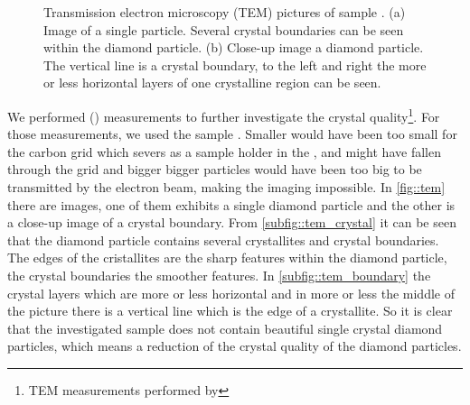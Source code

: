 \begin{figure}[tp]
\begin{subfigure}[t]{ 0.49\linewidth}
				\label{subfig::tem_boundary}
			\end{subfigure}
			\caption{Transmission electron microscopy (TEM) pictures of sample \insituH. (a) Image of a single \nd particle. Several crystal boundaries can be seen within the diamond particle. (b) Close-up image a diamond particle. The vertical line is a crystal boundary, to the left and right the more or less horizontal layers of one crystalline region can be seen.}
			\label{fig::tem}
		\end{figure}


		We performed \tem (\TEM) measurements to further investigate the crystal quality\footnote{TEM measurements performed by \schmauch}.
		For those \TEM measurements, we used the sample \insituH.
		Smaller \nds would have been too small for the carbon grid which severs as a sample holder in the \TEM, and might have fallen through the grid and bigger bigger particles would have been too big to be transmitted by the electron beam, making the imaging impossible.
		In \autoref{fig::tem} there are \TEM images, one of them exhibits a single diamond particle and the other is a close-up image of a crystal boundary. 
		From \autoref{subfig::tem_crystal} it can be seen that the diamond particle contains several crystallites and crystal boundaries. 
		The edges of the cristallites are the sharp features within the diamond particle, the crystal boundaries the smoother features.
		In \autoref{subfig::tem_boundary} the crystal layers which are more or less horizontal and in more or less the middle of the picture there is a vertical line which is the edge of a crystallite.
		So it is clear that the investigated sample does not contain beautiful single crystal diamond particles, which means a reduction of the crystal quality of the diamond particles.


